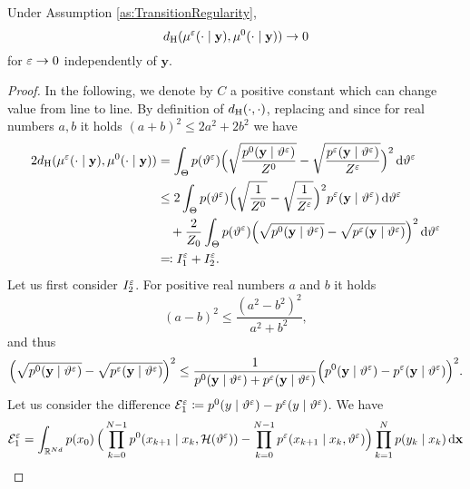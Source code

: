 \documentclass[10pt]{article}
\begin{document}
\begin{theorem} Under Assumption \ref{as:TransitionRegularity},
	\begin{equation}
		d_{\mathrm{H}}(\mu^\varepsilon(\cdot \mid \mathbf y), \mu^0(\cdot \mid \mathbf y)) \to 0
	\end{equation}
	for $\varepsilon \to 0$ independently of $\mathbf y$.	
\end{theorem}
\begin{proof}
	In the following, we denote by $C$ a positive constant which can change value from line to line. By definition of $d_{\mathrm{H}}(\cdot, \cdot)$, replacing and since for real numbers $a,b$ it holds $(a+b)^2 \leq 2a^2 + 2b^2$ we have
	\begin{equation}
	\begin{aligned}
		2d_{\mathrm{H}}(\mu^\varepsilon(\cdot \mid \mathbf y), \mu^0(\cdot \mid \mathbf y)) &= \int_{\Theta} p(\vartheta^\varepsilon) \Big(\sqrt{\frac{p^0(\mathbf y \mid \vartheta^\varepsilon)}{Z^0}} - \sqrt{\frac{p^\varepsilon(\mathbf y \mid \vartheta^\varepsilon)}{Z^\varepsilon}}\Big)^2 \,\mathrm{d} \vartheta^\varepsilon\\
		&\leq 2\int_{\Theta} p(\vartheta^\varepsilon) \Big(\sqrt{\frac{1}{Z^0}} - \sqrt{\frac{1}{Z^\varepsilon}}\Big)^2p^\varepsilon(\mathbf y \mid \vartheta^\varepsilon) \,\mathrm{d} \vartheta^\varepsilon\\
		&\quad + \frac{2}{Z_0} \int_{\Theta} p(\vartheta^\varepsilon)\Big(\sqrt{p^0(\mathbf y \mid \vartheta^\varepsilon)} - \sqrt{p^\varepsilon(\mathbf y \mid \vartheta^\varepsilon)}\Big)^2 \,\mathrm{d} \vartheta^\varepsilon \\
		&\eqqcolon I_1^\varepsilon + I_2^\varepsilon.
	\end{aligned}
	\end{equation}
	Let us first consider $I_2^\varepsilon$. For positive real numbers $a$ and $b$ it holds
	\begin{equation}
		(a -b)^2 \leq \frac{(a^2 - b^2)^2}{a^2 + b^2},
	\end{equation}
	and thus
	\begin{equation}
		\Big(\sqrt{p^0(\mathbf y \mid \vartheta^\varepsilon)} - \sqrt{p^\varepsilon(\mathbf y \mid \vartheta^\varepsilon)}\Big)^2 \leq \frac{1}{p^0(\mathbf y \mid \vartheta^\varepsilon) + p^\varepsilon(\mathbf y \mid \vartheta^\varepsilon)}\Big(p^0(\mathbf y \mid \vartheta^\varepsilon) - p^\varepsilon(\mathbf y \mid \vartheta^\varepsilon)\Big)^2.
	\end{equation}
	Let us consider the difference $\mathcal E_1^\varepsilon \coloneqq p^0(y \mid \vartheta^\varepsilon) - p^\varepsilon(y \mid \vartheta^\varepsilon)$. We have
	\begin{equation}\label{eq:HellProofE1}
	\begin{aligned}
		\mathcal E_1^\epl &= \int_{\R^{Nd}} p(x_0) \, \Big(\prod_{k=0}^{N-1} p^0(x_{k+1}\mid x_k, \mathcal H(\theta^\epl)) - \prod_{k=0}^{N-1} p^\epl(x_{k+1}\mid x_k, \theta^\epl)\Big) \prod_{k=1}^{N} p(y_k \mid x_k) \dd \mathbf x \\

\end{aligned}
\end{equation}
\end{proof}
\end{document}
